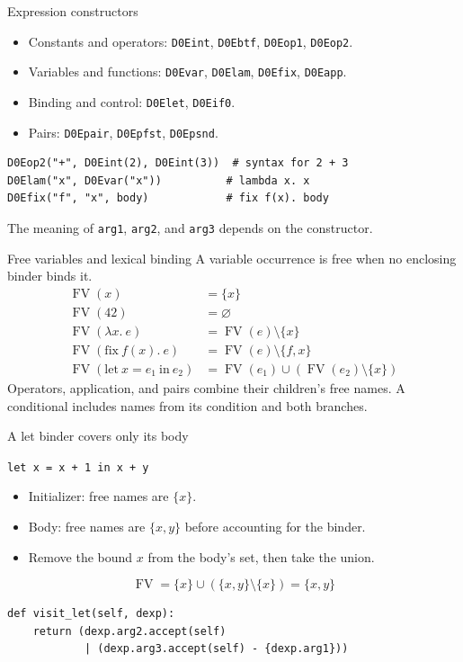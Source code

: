 \documentclass[aspectratio=169,11pt]{beamer}
\newcommand{\code}[1]{\texttt{#1}}
\begin{document}
\begin{frame}[fragile]{Expression constructors}
\begin{itemize}
\item Constants and operators: \code{D0Eint}, \code{D0Ebtf}, \code{D0Eop1}, \code{D0Eop2}.
\item Variables and functions: \code{D0Evar}, \code{D0Elam}, \code{D0Efix}, \code{D0Eapp}.
\item Binding and control: \code{D0Elet}, \code{D0Eif0}.
\item Pairs: \code{D0Epair}, \code{D0Epfst}, \code{D0Epsnd}.
\end{itemize}
\begin{lstlisting}
D0Eop2("+", D0Eint(2), D0Eint(3))  # syntax for 2 + 3
D0Elam("x", D0Evar("x"))          # lambda x. x
D0Efix("f", "x", body)            # fix f(x). body
\end{lstlisting}
The meaning of \code{arg1}, \code{arg2}, and \code{arg3} depends on the constructor.
\end{frame}

\begin{frame}{Free variables and lexical binding}
A variable occurrence is free when no enclosing binder binds it.
\begin{align*}
\operatorname{FV}(x) &= \{x\} \\
\operatorname{FV}(42) &= \varnothing \\
\operatorname{FV}(\lambda x.\ e) &= \operatorname{FV}(e)\setminus\{x\} \\
\operatorname{FV}(\mathrm{fix}\ f(x).\ e) &= \operatorname{FV}(e)\setminus\{f,x\} \\
\operatorname{FV}(\mathrm{let}\ x=e_1\ \mathrm{in}\ e_2)
 &= \operatorname{FV}(e_1)\cup(\operatorname{FV}(e_2)\setminus\{x\})
\end{align*}
Operators, application, and pairs combine their children's free names.
A conditional includes names from its condition and both branches.
\end{frame}

\begin{frame}[fragile]{A let binder covers only its body}
\begin{center}\Large \code{let x = x + 1 in x + y}\end{center}
\begin{itemize}
\item Initializer: free names are $\{x\}$.
\item Body: free names are $\{x,y\}$ before accounting for the binder.
\item Remove the bound $x$ from the body's set, then take the union.
\end{itemize}
\[
\operatorname{FV} = \{x\}\cup(\{x,y\}\setminus\{x\}) = \{x,y\}
\]
\begin{lstlisting}
def visit_let(self, dexp):
    return (dexp.arg2.accept(self)
            | (dexp.arg3.accept(self) - {dexp.arg1}))
\end{lstlisting}
\end{frame}
\end{document}
